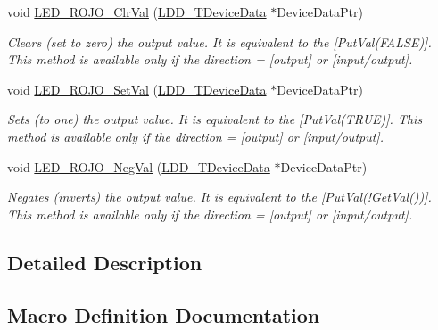 \begin{DoxyCompactItemize}
void \hyperlink{group___l_e_d___r_o_j_o__module_ga81c28e19caf4918349ca019707a53b4d}{L\+E\+D\+\_\+\+R\+O\+J\+O\+\_\+\+Clr\+Val} (\hyperlink{group___p_e___types__module_gac5cf1362f1f0e3a2ce71b1bf2276d091}{L\+D\+D\+\_\+\+T\+Device\+Data} $\ast$Device\+Data\+Ptr)
\begin{DoxyCompactList}\small\item\em Clears (set to zero) the output value. It is equivalent to the \mbox{[}Put\+Val(\+F\+A\+L\+S\+E)\mbox{]}. This method is available only if the direction = {\itshape \mbox{[}output\mbox{]}} or {\itshape \mbox{[}input/output\mbox{]}}. \end{DoxyCompactList}\item 
void \hyperlink{group___l_e_d___r_o_j_o__module_ga4f274068fd9574e502968a57fef5d564}{L\+E\+D\+\_\+\+R\+O\+J\+O\+\_\+\+Set\+Val} (\hyperlink{group___p_e___types__module_gac5cf1362f1f0e3a2ce71b1bf2276d091}{L\+D\+D\+\_\+\+T\+Device\+Data} $\ast$Device\+Data\+Ptr)
\begin{DoxyCompactList}\small\item\em Sets (to one) the output value. It is equivalent to the \mbox{[}Put\+Val(\+T\+R\+U\+E)\mbox{]}. This method is available only if the direction = {\itshape \mbox{[}output\mbox{]}} or {\itshape \mbox{[}input/output\mbox{]}}. \end{DoxyCompactList}\item 
void \hyperlink{group___l_e_d___r_o_j_o__module_gac3e38c550def5f3c42efa10f85d3b8c1}{L\+E\+D\+\_\+\+R\+O\+J\+O\+\_\+\+Neg\+Val} (\hyperlink{group___p_e___types__module_gac5cf1362f1f0e3a2ce71b1bf2276d091}{L\+D\+D\+\_\+\+T\+Device\+Data} $\ast$Device\+Data\+Ptr)
\begin{DoxyCompactList}\small\item\em Negates (inverts) the output value. It is equivalent to the \mbox{[}Put\+Val(!\+Get\+Val())\mbox{]}. This method is available only if the direction = {\itshape \mbox{[}output\mbox{]}} or {\itshape \mbox{[}input/output\mbox{]}}. \end{DoxyCompactList}\end{DoxyCompactItemize}


\subsection{Detailed Description}


\subsection{Macro Definition Documentation}
